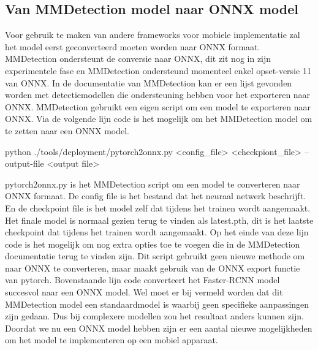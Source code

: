 \subsection{Van MMDetection model naar ONNX model}
Voor gebruik te maken van andere frameworks voor mobiele implementatie zal het model eerst geconverteerd moeten worden naar ONNX formaat.
MMDetection ondersteunt de conversie naar ONNX, dit zit nog in zijn experimentele fase en MMDetection ondersteund momenteel enkel opset-versie 11 van ONNX.
In de documentatie van MMDetection kan er een lijst gevonden worden met detectiemodellen die ondersteuning hebben voor het exporteren naar ONNX.
MMDetection gebruikt een eigen script om een model te exporteren naar ONNX.
Via de volgende lijn code is het mogelijk om het MMDetection model om te zetten naar een ONNX model.

\begin{python}
python ./tools/deployment/pytorch2onnx.py <config_file> <checkpiont_file> 
	--output-file <output file>
\end{python}

pytorch2onnx.py is het MMDetection script om een model te converteren naar ONNX formaat.
De config file is het bestand dat het neuraal netwerk beschrijft.
En de checkpoint file is het model zelf dat tijdens het trainen wordt aangemaakt.
Het finale model is normaal gezien terug te vinden als latest.pth, dit is het laatste checkpoint dat tijdens het trainen wordt aangemaakt.
Op het einde van deze lijn code is het mogelijk om nog extra opties toe te voegen die in de MMDetection documentatie terug te vinden zijn.
Dit script gebruikt geen nieuwe methode om naar ONNX te converteren, maar maakt gebruik van de ONNX export functie van pytorch.
Bovenstaande lijn code converteert het Faster-RCNN model succesvol naar een ONNX model.
Wel moet er bij vermeld worden dat dit MMDetection model een standaardmodel is waarbij geen specifieke aanpassingen zijn gedaan.
Dus bij complexere modellen zou het resultaat anders kunnen zijn.
Doordat we nu een ONNX model hebben zijn er een aantal nieuwe mogelijkheden om het model te implementeren op een mobiel apparaat.

